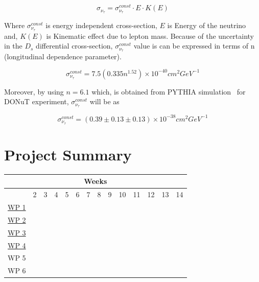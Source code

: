 \documentclass[12pt]{report}
\newcommand{\xmark}{\ding{53}}
\begin{document}
\begin{equation}
\sigma_{\nu_\tau} = \sigma^{const}_{\nu_\tau} \cdot E \cdot K(E)
\end{equation}

Where $\sigma^{const}_{\nu_\tau}$ is energy independent cross-section, $E$ is Energy of the neutrino and, $K(E)$ is Kinematic effect due to lepton mass. Because of the uncertainty in the $D_s$ differential cross-section, $\sigma^{const}_{\nu_\tau}$ value is can be expressed in terms of n (longitudinal dependence parameter).

\begin{equation}
\sigma^{const}_{\nu_\tau} = 7.5(0.335n^{1.52}) \times 10^{-40} cm^{2} GeV^{-1}
\end{equation}

Moreover, by using $n = 6.1$ which, is obtained from PYTHIA simulation~\cite{sjostrand_mrenna_skands_2007} for DONuT experiment, $\sigma^{const}_{\nu_\tau}$ will be as

\begin{equation}
\sigma^{const}_{\nu_\tau} = (0.39 \pm 0.13 \pm 0.13) \times 10^{-38} cm^{2} GeV^{-1}
\end{equation}

\newpage

\section{Project Summary}

\begin{table}[htp]
\centering
{}
\begin{tabular}{ | c || c | c | c | c | c | c | c | c | c | c | c | c | c | }
\hline
\multicolumn{14}{|c|}{Weeks}\\
\hline
\hline
 & 2 & 3 & 4 & 5 & 6 & 7 & 8 & 9 & 10 & 11 & 12 & 13 & 14 \\
\hline
\hyperref[sec:WP1]{WP 1} & \xmark & \xmark & \xmark & & & & & & & & & & \\
\hline
\hyperref[sec:WP2]{WP 2} & & & \xmark & \xmark & \xmark & & & & & & & & \\
\hline
\hyperref[sec:WP3]{WP 3} & & & & & \xmark & \xmark & \xmark & \xmark & & & & & \\
\hline
\hyperref[sec:WP4]{WP 4} & & & & & & & & \xmark & \xmark & \xmark & & & \\
\hline
WP 5 & & & & & & & & & & \xmark & \xmark & \xmark & \xmark \\
\hline
WP 6 & & & & & & & & & & & \xmark & \xmark & \\
\hline

\end{tabular}
\end{table}
\end{document}
